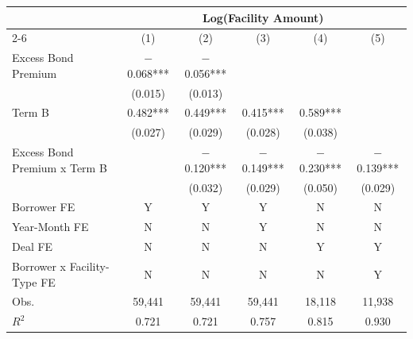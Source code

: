 {
\def\sym#1{\ifmmode^{#1}\else\(^{#1}\)\fi}
\begin{tabular}{l*{5}{c}}
\toprule\toprule
                                        &\multicolumn{5}{c}{Log(Facility Amount)}                                       \\\cmidrule(lr){2-6}
                                        &\multicolumn{1}{c}{(1)}   &\multicolumn{1}{c}{(2)}   &\multicolumn{1}{c}{(3)}   &\multicolumn{1}{c}{(4)}   &\multicolumn{1}{c}{(5)}   \\
\toprule
Excess Bond Premium                     &    $-$0.068***&    $-$0.056***&               &               &               \\
                                        &     (0.015)   &     (0.013)   &               &               &               \\
[1em]
Term B                                  &       0.482***&       0.449***&       0.415***&       0.589***&               \\
                                        &     (0.027)   &     (0.029)   &     (0.028)   &     (0.038)   &               \\
[1em]
Excess Bond Premium x Term B            &               &    $-$0.120***&    $-$0.149***&    $-$0.230***&    $-$0.139***\\
                                        &               &     (0.032)   &     (0.029)   &     (0.050)   &     (0.029)   \\
\toprule
Borrower FE                             &           Y   &           Y   &           Y   &           N   &           N   \\
Year-Month FE                           &           N   &           N   &           Y   &           N   &           N   \\
Deal FE                                 &           N   &           N   &           N   &           Y   &           Y   \\
Borrower x Facility-Type FE             &           N   &           N   &           N   &           N   &           Y   \\
Obs.                                    &      59,441   &      59,441   &      59,441   &      18,118   &      11,938   \\
$R^2$                                   &       0.721   &       0.721   &       0.757   &       0.815   &       0.930   \\
\toprule\toprule
\end{tabular}
}
